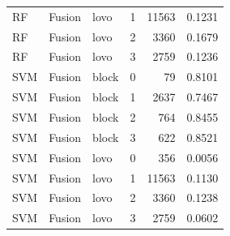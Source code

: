 \begin{tabular}{lllrrr}
RF & Fusion & lovo & 1 & 11563 & 0.1231 \\
RF & Fusion & lovo & 2 & 3360 & 0.1679 \\
RF & Fusion & lovo & 3 & 2759 & 0.1236 \\
SVM & Fusion & block & 0 & 79 & 0.8101 \\
SVM & Fusion & block & 1 & 2637 & 0.7467 \\
SVM & Fusion & block & 2 & 764 & 0.8455 \\
SVM & Fusion & block & 3 & 622 & 0.8521 \\
SVM & Fusion & lovo & 0 & 356 & 0.0056 \\
SVM & Fusion & lovo & 1 & 11563 & 0.1130 \\
SVM & Fusion & lovo & 2 & 3360 & 0.1238 \\
SVM & Fusion & lovo & 3 & 2759 & 0.0602 \\
\bottomrule
\end{tabular}
